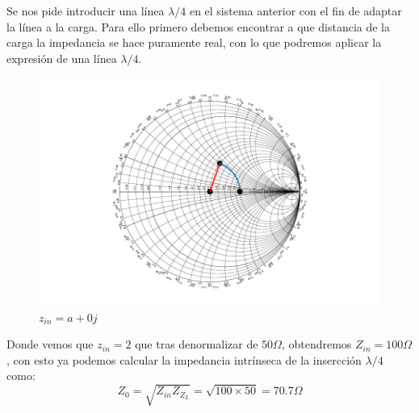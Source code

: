 Se nos pide introducir una línea $\lambda/4$ en el sistema anterior con el fin de adaptar la línea a la carga. Para ello primero debemos encontrar a que distancia de la carga la impedancia se hace puramente real, con lo que podremos aplicar la expresión de una línea  $\lambda/4$.
\begin{figure}[h]
  \centering
  \includegraphics{ej9/images/out.pdf}
  \caption{$z_{in} = a + 0j$}
  \label{ej2smith}
\end{figure}

Donde vemos que $z_{in} = 2$ que tras denormalizar de $50 \Omega$, obtendremos $Z_{in} = 100 \Omega$, con esto ya podemos calcular la impedancia intrínseca de la insercción $\lambda/4$ como:
\[ Z_0 = \sqrt{Z_{in} Z_{Z_L}} = \sqrt{100 \times 50} = 70.7 \Omega \]
